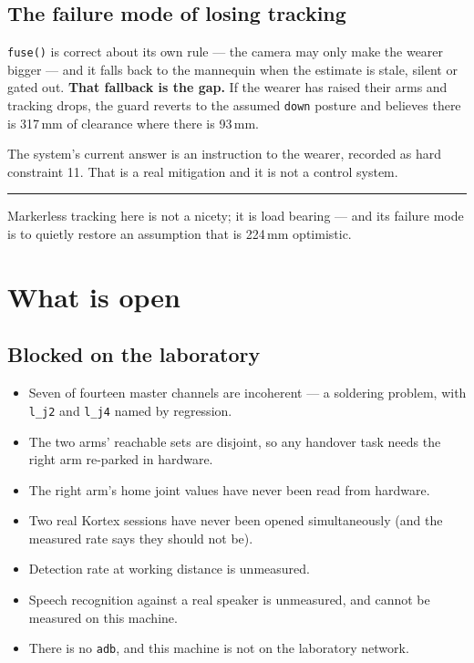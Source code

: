 \documentclass[11pt,a4paper,oneside]{report}
\newcommand{\code}[1]{\texttt{\small #1}}
\newcommand{\keyfact}[1]{%
  \par\vspace{7pt}\noindent
  \hspace*{0pt}\textcolor{srlblue}{\rule{2.5pt}{\dimexpr\baselineskip\relax}}%
  \hspace{9pt}%
  \begin{minipage}[t]{\dimexpr\textwidth-14pt\relax}
  \small #1
  \end{minipage}\par\vspace{7pt}}
\begin{document}
\section{The failure mode of losing tracking}

\code{fuse()} is correct about its own rule --- the camera may only make the
wearer bigger --- and it falls back to the mannequin when the estimate is stale,
silent or gated out. \textbf{That fallback is the gap.} If the wearer has raised
their arms and tracking drops, the guard reverts to the assumed \code{down}
posture and believes there is 317\,mm of clearance where there is 93\,mm.

The system's current answer is an instruction to the wearer, recorded as hard
constraint 11. That is a real mitigation and it is not a control system.

\keyfact{Markerless tracking here is not a nicety; it is load bearing --- and
its failure mode is to quietly restore an assumption that is 224\,mm
optimistic.}

\chapter{What is open}

\section{Blocked on the laboratory}

\begin{itemize}
\item Seven of fourteen master channels are incoherent --- a soldering problem,
      with \code{l\_j2} and \code{l\_j4} named by regression.
\item The two arms' reachable sets are disjoint, so any handover task needs the
      right arm re-parked in hardware.
\item The right arm's home joint values have never been read from hardware.
\item Two real Kortex sessions have never been opened simultaneously (and the
      measured rate says they should not be).
\item Detection rate at working distance is unmeasured.
\item Speech recognition against a real speaker is unmeasured, and cannot be
      measured on this machine.
\item There is no \code{adb}, and this machine is not on the laboratory network.
\end{itemize}
\end{document}
